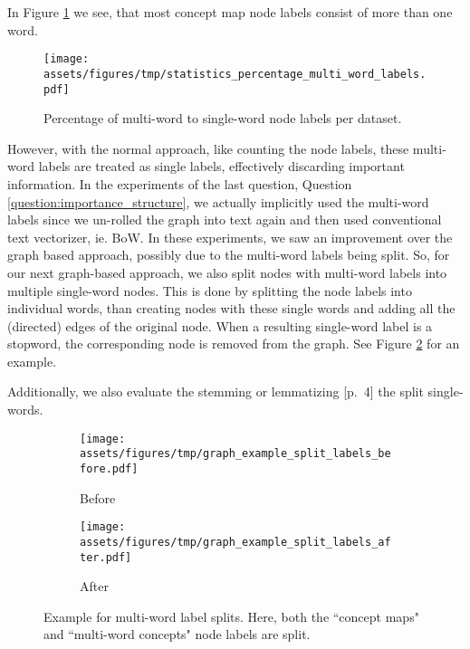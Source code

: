 In Figure \ref{fig:statistics_percentage_multi_word_labels} we see, that most concept map node labels consist of more than one word.

\begin{figure}[htb!]
    \centering
    \texttt{[image: assets/figures/tmp/statistics\_percentage\_multi\_word\_labels.pdf]}
    \caption[Statistics: Percentage multi-word node labels]{Percentage of multi-word to single-word node labels per dataset.}\label{fig:statistics_percentage_multi_word_labels}
\end{figure}

However, with the normal approach, like counting the node labels, these multi-word labels are treated as single labels, effectively discarding important information.
In the experiments of the last question, Question \ref{question:importance_structure}, we actually implicitly used the multi-word labels since we un-rolled the graph into text again and then used conventional text vectorizer, ie. BoW.
In these experiments, we saw an improvement over the graph based approach, possibly due to the multi-word labels being split.
So, for our next graph-based approach, we also split nodes with multi-word labels into multiple single-word nodes.
This is done by splitting the node labels into individual words, than creating nodes with these single words and adding all the (directed) edges of the original node.
When a resulting single-word label is a stopword, the corresponding node is removed from the graph.
See Figure \ref{fig:example_split_labels} for an example.

Additionally, we also evaluate the stemming or lemmatizing [p.~4]\cite{Manning2000} the split single-words.

\begin{figure}[htb!]
    \centering
    \begin{subfigure}[t]{.4\linewidth}  {\texttt{[image: assets/figures/tmp/graph\_example\_split\_labels\_before.pdf]}}
        \caption{Before}
    \end{subfigure}
\hspace{2cm}
    \begin{subfigure}[t]{.4\linewidth}  {\texttt{[image: assets/figures/tmp/graph\_example\_split\_labels\_after.pdf]}}
        \caption{After}
    \end{subfigure}
    \caption[Example: Multi-word node labels Splitting]{Example for multi-word label splits. Here, both the ``concept maps" and ``multi-word concepts" node labels are  split.}\label{fig:example_split_labels}
\end{figure}

